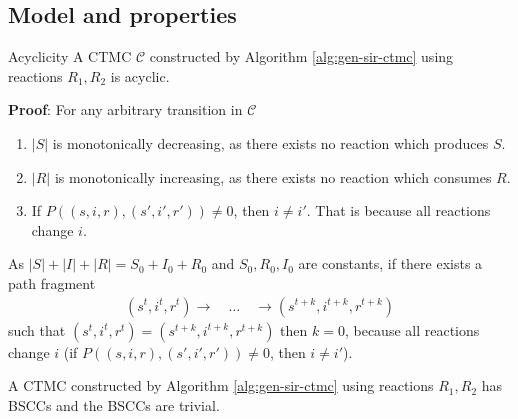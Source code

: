 \subsection{Model and properties}
\begin{theorem}{Acyclicity}
    A CTMC $\mathcal{C}$ constructed by Algorithm \ref{alg:gen-sir-ctmc} using reactions
    $R_1, R_2$ is acyclic.
\end{theorem}
\textbf{Proof}: For any arbitrary transition in $\mathcal{C}$
\begin{enumerate}
    \item $|S|$ is monotonically decreasing, as there exists no reaction which produces $S$.
    \item $|R|$ is monotonically increasing, as there exists no reaction which consumes $R$.
    \item If $P((s,i,r), (s',i',r'))\neq 0$, then $i \neq i'$. That is because all reactions change $i$.
\end{enumerate}
As $|S| + |I| + |R| = S_0 + I_0 + R_0$ and $S_0,R_0,I_0$ are constants, if there exists a path fragment
\begin{align*}
    (s^t,i^t,r^t)\rightarrow \quad \ldots \quad \rightarrow(s^{t+k},i^{t+k},r^{t+k})
\end{align*}
such that $(s^t,i^t,r^t) = (s^{t+k},i^{t+k},r^{t+k})$ then $k=0$, because all reactions change $i$
(if $P((s,i,r), (s',i',r'))\neq 0$, then $i \neq i'$). \QED
\begin{corollary}
    A CTMC constructed by Algorithm \ref{alg:gen-sir-ctmc} using reactions $R_1, R_2$ has BSCCs
    and the BSCCs are trivial.
\end{corollary}

